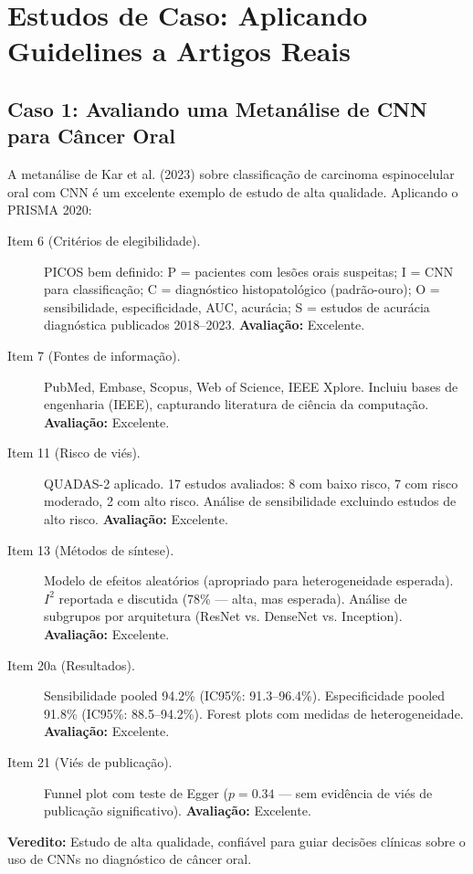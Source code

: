 \section{Estudos de Caso: Aplicando Guidelines a Artigos Reais}

\subsection{Caso 1: Avaliando uma Metanálise de CNN para Câncer Oral}

A metanálise de Kar et al. (2023) \cite{ODT-010} sobre classificação de carcinoma espinocelular oral com CNN é um excelente exemplo de estudo de alta qualidade. Aplicando o PRISMA 2020:

\begin{description}
    \item[Item 6 (Critérios de elegibilidade).] PICOS bem definido: P = pacientes com lesões orais suspeitas; I = CNN para classificação; C = diagnóstico histopatológico (padrão-ouro); O = sensibilidade, especificidade, AUC, acurácia; S = estudos de acurácia diagnóstica publicados 2018--2023. \textbf{Avaliação:} Excelente.
    \item[Item 7 (Fontes de informação).] PubMed, Embase, Scopus, Web of Science, IEEE Xplore. Incluiu bases de engenharia (IEEE), capturando literatura de ciência da computação. \textbf{Avaliação:} Excelente.
    \item[Item 11 (Risco de viés).] QUADAS-2 aplicado. 17 estudos avaliados: 8 com baixo risco, 7 com risco moderado, 2 com alto risco. Análise de sensibilidade excluindo estudos de alto risco. \textbf{Avaliação:} Excelente.
    \item[Item 13 (Métodos de síntese).] Modelo de efeitos aleatórios (apropriado para heterogeneidade esperada). $I^2$ reportada e discutida (78\% — alta, mas esperada). Análise de subgrupos por arquitetura (ResNet vs. DenseNet vs. Inception). \textbf{Avaliação:} Excelente.
    \item[Item 20a (Resultados).] Sensibilidade pooled 94.2\% (IC95\%: 91.3--96.4\%). Especificidade pooled 91.8\% (IC95\%: 88.5--94.2\%). Forest plots com medidas de heterogeneidade. \textbf{Avaliação:} Excelente.
    \item[Item 21 (Viés de publicação).] Funnel plot com teste de Egger ($p = 0.34$ — sem evidência de viés de publicação significativo). \textbf{Avaliação:} Excelente.
\end{description}

\textbf{Veredito:} Estudo de alta qualidade, confiável para guiar decisões clínicas sobre o uso de CNNs no diagnóstico de câncer oral.

